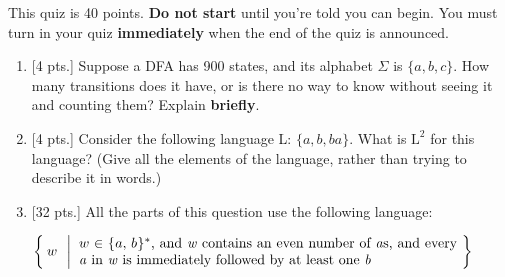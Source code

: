 \documentclass[11pt]{article}
\newcommand{\sms}{\ensuremath{\hspace{.1mm}}}
\begin{document}
  \hspace{\fill}%
  \nameblock

  \smallskip


  \vspace{-3mm}

    \noindent
    This quiz is 40 points.  \textbf{Do not start} until you're told you can
  begin.  You must turn in your quiz \textbf{immediately} when the end of
  the quiz is announced.

  \vspace{-2mm}

  \begin{enumerate}

    \addtolength{\itemsep}{20mm}

    \item {[4 pts.]} Suppose a DFA has 900 states, and its alphabet $\Sigma$
          is $\{a, b, c\}$.  How many transitions does it have, or is there
          no way to know without seeing it and counting them?  Explain
          \textbf{briefly}.

    \item {[4 pts.]} Consider the following language L:
           \(
             \{ a, b, ba \}
           \).
          What is $\mathrm{L}^2$ for this language?  (Give all the elements
          of the language, rather than trying to describe it in words.)

          \addtolength{\itemsep}{18mm}

    \item {[32 pts.]} All the parts of this question use the following
          language:

          \vspace{-1mm}

          \begin{centering}

            \(
              \left\{
                \:
                \begin{array}[t]{@{}l}
                w
                \end{array}
                \left| \ \:
                \parbox[c]{3.75in}{
                  $w \sms \in \sms \{ \sms a, \, b \sms \}^*$,
                  and \emph{w} contains an even number of
                        \emph{a}s, and every \emph{a} in \textit{w} is
                        immediately followed by at least one \emph{b}
                }
              \:
              \right.
              \right\}
            \)


\end{centering}
\end{enumerate}
\end{document}
